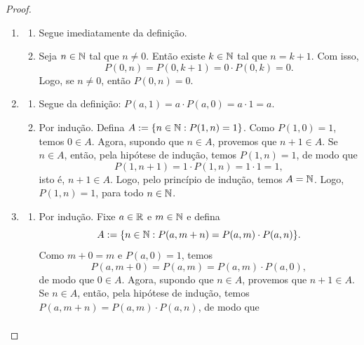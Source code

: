 \begin{proof}
    \leavevmode
        \begin{enumerate}[leftmargin=*, align=left, label=\textbf{(\alph*)}]
            \item
                \begin{enumerate}[label=\roman*.]
                    \item Segue imediatamente da definição.
                    \item Seja $n \in \mathbb{N}$ tal que $n \neq 0$. Então existe $k \in \mathbb{N}$ tal que $n = k+1$. Com isso,
                        \[
                            P(0,n) = P(0,k+1) = 0 \cdot P(0,k) = 0.
                        \]
                    Logo, se $n \neq 0$, então $P(0,n) = 0$.
                \end{enumerate}
            \blackproof
            \item
                \begin{enumerate}[label=\roman*.]
                    \item Segue da definição: $P(a,1) = a \cdot P(a,0) = a \cdot 1 = a$.
                    \item Por indução. Defina $A := \{n \in \mathbb{N} : P(1,n) = 1\}$. Como $P(1,0) = 1$, temos $0 \in A$. Agora, supondo que $n \in A$, provemos que $n+1 \in A$. Se $n \in A$, então, pela hipótese de indução, temos $P(1,n) = 1$, de modo que
                        \[
                            P(1,n+1) = 1 \cdot P(1,n) = 1 \cdot 1 = 1,
                        \]
                    isto é, $n+1 \in A$. Logo, pelo princípio de indução, temos $A = \mathbb{N}$. Logo, $P(1,n) = 1$, para todo $n \in \mathbb{N}$.
                \end{enumerate}
            \blackproof
            \item 
                \begin{enumerate}[label=\roman*.]
                    \item Por indução. Fixe $a \in \mathbb{R}$ e $m \in \mathbb{N}$ e defina
                        \[
                            A := \{n \in \mathbb{N} : P(a,m+n) = P(a,m) \cdot P(a,n)\}.
                        \]
                    Como $m+0 = m$ e $P(a,0) = 1$, temos
                        \[
                            P(a,m+0) = P(a,m) = P(a,m) \cdot P(a,0),
                        \]
                    de modo que $0 \in A$. Agora, supondo que $n \in A$, provemos que $n+1 \in A$. Se $n \in A$, então, pela hipótese de indução, temos $P(a,m+n) = P(a,m) \cdot P(a,n)$, de modo que
                        \begin{align*}

\end{align*}
\end{enumerate}
\end{enumerate}
\end{proof}
